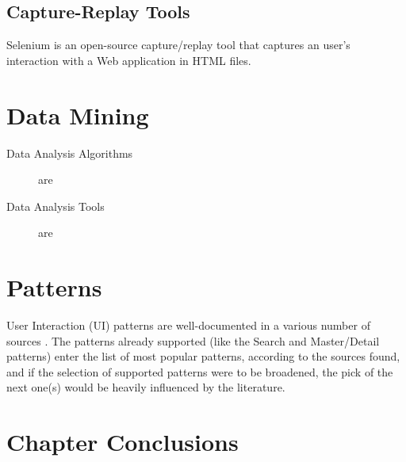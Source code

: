 \subsection{Capture-Replay Tools}

Selenium \cite{selenium} is an open-source capture/replay tool that captures an user's interaction with a Web application in HTML files.

\section{Data Mining}\label{sec:datamining}

\begin{description}
\item[Data Analysis Algorithms]  are

\item[Data Analysis Tools]  are
\end{description}


\section{Patterns}\label{sec:patterns}
User Interaction (UI) patterns are well-documented in a various number of sources \cite{tidwell2010designing,van2001patterns, neil12standard,sinnig2005patterns}. The patterns already supported (like the Search and Master/Detail patterns) enter the list of most popular patterns, according to the sources found, and if the selection of supported patterns were to be broadened, the pick of the next one(s) would be heavily influenced by the literature.





\section{Chapter Conclusions}
